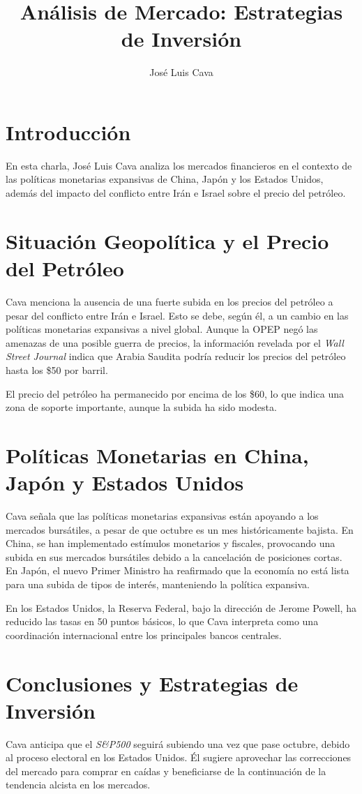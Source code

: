 \documentclass{article}
\title{Análisis de Mercado: Estrategias de Inversión}
\author{José Luis Cava}
\date{}
\begin{document}
\maketitle

\section*{Introducción}
En esta charla, José Luis Cava analiza los mercados financieros en el contexto de las políticas monetarias expansivas de China, Japón y los Estados Unidos, además del impacto del conflicto entre Irán e Israel sobre el precio del petróleo.

\section*{Situación Geopolítica y el Precio del Petróleo}
Cava menciona la ausencia de una fuerte subida en los precios del petróleo a pesar del conflicto entre Irán e Israel. Esto se debe, según él, a un cambio en las políticas monetarias expansivas a nivel global. Aunque la OPEP negó las amenazas de una posible guerra de precios, la información revelada por el \textit{Wall Street Journal} indica que Arabia Saudita podría reducir los precios del petróleo hasta los \$50 por barril.

El precio del petróleo ha permanecido por encima de los \$60, lo que indica una zona de soporte importante, aunque la subida ha sido modesta.

\section*{Políticas Monetarias en China, Japón y Estados Unidos}
Cava señala que las políticas monetarias expansivas están apoyando a los mercados bursátiles, a pesar de que octubre es un mes históricamente bajista. En China, se han implementado estímulos monetarios y fiscales, provocando una subida en sus mercados bursátiles debido a la cancelación de posiciones cortas. En Japón, el nuevo Primer Ministro ha reafirmado que la economía no está lista para una subida de tipos de interés, manteniendo la política expansiva.

En los Estados Unidos, la Reserva Federal, bajo la dirección de Jerome Powell, ha reducido las tasas en 50 puntos básicos, lo que Cava interpreta como una coordinación internacional entre los principales bancos centrales.

\section*{Conclusiones y Estrategias de Inversión}
Cava anticipa que el \textit{S\&P500} seguirá subiendo una vez que pase octubre, debido al proceso electoral en los Estados Unidos. Él sugiere aprovechar las correcciones del mercado para comprar en caídas y beneficiarse de la continuación de la tendencia alcista en los mercados.
\end{document}

